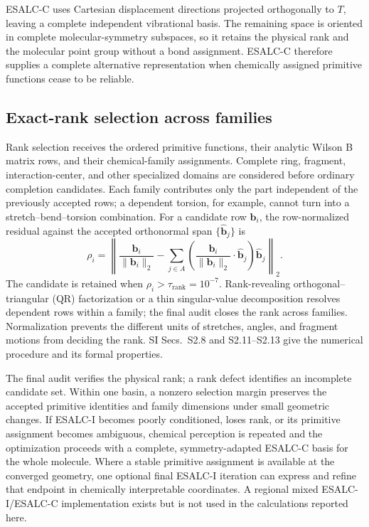 \documentclass[journal=jctcce,manuscript=article,layout=traditional]{achemso}
\theoremstyle{definition}
\begin{document}
{ESALC-C uses Cartesian displacement directions projected
orthogonally to \(T\), leaving a complete independent vibrational basis.
The remaining space is oriented in
complete molecular-symmetry subspaces, so it retains the physical rank and
the molecular point group without a bond assignment. ESALC-C therefore
supplies a complete alternative representation when chemically assigned
primitive functions cease to be reliable.}
\subsection{Exact-rank selection across families}

{Rank selection receives the ordered primitive functions,
their analytic Wilson B matrix rows, and their chemical-family assignments.
Complete ring, fragment, interaction-center, and other specialized domains
are considered before ordinary completion candidates. Each family contributes
only the part independent of the previously accepted rows; a dependent
torsion, for example, cannot turn into a stretch--bend--torsion combination.
For a candidate row \(\mathbf b_i\), the row-normalized residual against the
accepted orthonormal span \(\{\widehat{\mathbf b}_j\}\) is}
{
\begin{equation}
 \rho_i=\left\|
 \frac{\mathbf b_i}{\|\mathbf b_i\|_2}
 -\sum_{j\in A}
 \left(\frac{\mathbf b_i}{\|\mathbf b_i\|_2}\cdot
 \widehat{\mathbf b}_j\right)\widehat{\mathbf b}_j
 \right\|_2 .
 \label{eq:rank-residual}
\end{equation}
}
{The candidate is retained when
\(\rho_i>\tau_{\mathrm{rank}}=10^{-7}\). Rank-revealing
orthogonal--triangular (QR) factorization or a thin singular-value
decomposition resolves dependent rows within a family;\cite{GolubReinsch1970} the final audit
closes the rank across families. Normalization prevents the different units
of stretches, angles, and fragment motions from deciding the rank. SI
Secs.~S2.8 and S2.11--S2.13 give the numerical procedure and its formal
properties.}

The final audit verifies the physical rank; a rank defect identifies an
incomplete candidate set.
{Within one basin, a nonzero selection margin preserves the
accepted primitive identities and family dimensions under small geometric
changes.  If ESALC-I becomes poorly conditioned, loses rank, or its primitive
assignment becomes ambiguous, chemical perception is repeated and the
optimization proceeds with a complete, symmetry-adapted ESALC-C basis for the
whole molecule.  Where a stable primitive assignment is available at the
converged geometry, one optional final ESALC-I iteration can express and refine
that endpoint in chemically interpretable coordinates.  A regional mixed
ESALC-I/ESALC-C implementation exists but is not used in the calculations
reported here.}
\end{document}

